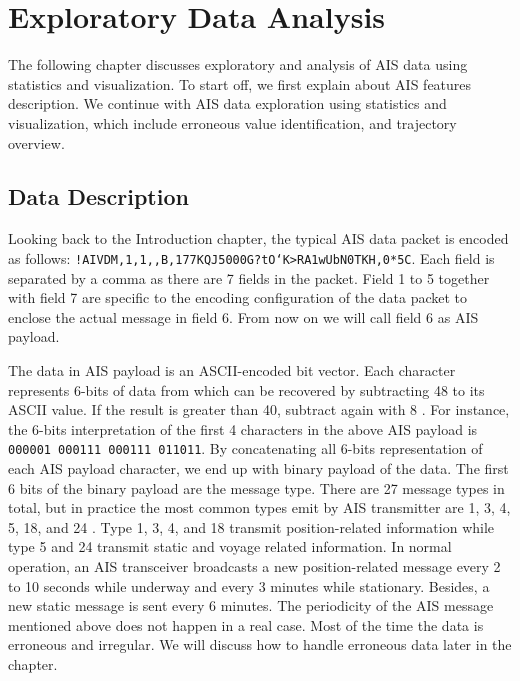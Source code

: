 \chapter{Exploratory Data Analysis}
\label{ch:eda}
\vspace{2em}

The following chapter discusses exploratory and analysis of AIS data using statistics and visualization. To start off, we first explain about AIS features description. We continue with AIS data exploration using statistics and visualization, which include erroneous value identification, and trajectory overview. 

\section{Data Description}
Looking back to the Introduction chapter, the typical AIS data packet is encoded as follows: \texttt{!AIVDM,1,1,,B,177KQJ5000G?tO`K>RA1wUbN0TKH,0*5C}. Each field is separated by a comma as there are 7 fields in the packet. Field 1 to 5 together with field 7 are specific to the encoding configuration of the data packet to enclose the actual message in field 6. From now on we will call field 6 as AIS payload.

The data in AIS payload is an ASCII-encoded bit vector. Each character represents 6-bits of data from which can be recovered by subtracting 48 to its ASCII value. If the result is greater than 40, subtract again with 8 \cite{aivsprotocolraymond}. For instance, the 6-bits interpretation of the first 4 characters in the above AIS payload is \texttt{000001 000111 000111 011011}. By concatenating all 6-bits representation of each AIS payload character, we end up with binary payload of the data. The first 6 bits of the binary payload are the message type. There are 27 message types in total, but in practice the most common types emit by AIS transmitter are 1, 3, 4, 5, 18, and 24 \cite{aivsprotocolraymond}. Type 1, 3, 4, and 18 transmit position-related information while type 5 and 24 transmit static and voyage related information. In normal operation, an AIS transceiver broadcasts a new position-related message every 2 to 10 seconds while underway and every 3 minutes while stationary. Besides, a new static message is sent every 6 minutes. The periodicity of the AIS message mentioned above does not happen in a real case. Most of the time the data is erroneous and irregular. We will discuss how to handle erroneous data later in the chapter.

